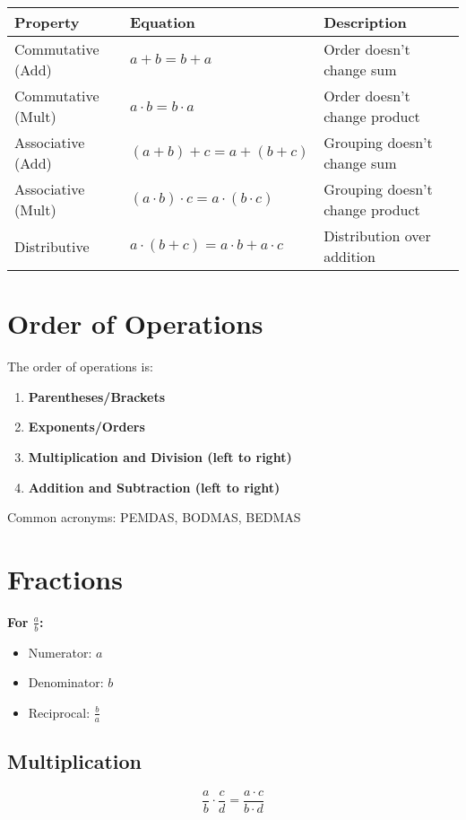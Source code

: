 \documentclass[12pt]{article}
\begin{document}
\begin{tabular}{|l|l|p{8cm}|}
\hline
\textbf{Property} & \textbf{Equation} & \textbf{Description} \\
\hline
Commutative (Add) & $a + b = b + a$ & Order doesn't change sum \\
Commutative (Mult) & $a \cdot b = b \cdot a$ & Order doesn't change product \\
Associative (Add) & $(a + b) + c = a + (b + c)$ & Grouping doesn't change sum \\
Associative (Mult) & $(a \cdot b) \cdot c = a \cdot (b \cdot c)$ & Grouping doesn't change product \\
Distributive & $a \cdot (b + c) = a \cdot b + a \cdot c$ & Distribution over addition \\
\hline
\end{tabular}

\section*{Order of Operations}

The order of operations is:
\begin{enumerate}[label=\arabic*.]
    \item \textbf{Parentheses/Brackets}
    \item \textbf{Exponents/Orders}
    \item \textbf{Multiplication and Division (left to right)}
    \item \textbf{Addition and Subtraction (left to right)}
\end{enumerate}
Common acronyms: PEMDAS, BODMAS, BEDMAS

\section*{Fractions}

\textbf{For $\frac{a}{b}$:}
\begin{itemize}
    \item Numerator: $a$
    \item Denominator: $b$
    \item Reciprocal: $\frac{b}{a}$
\end{itemize}

\subsection*{Multiplication}
\[
\frac{a}{b} \cdot \frac{c}{d} = \frac{a \cdot c}{b \cdot d}
\]
\end{document}
